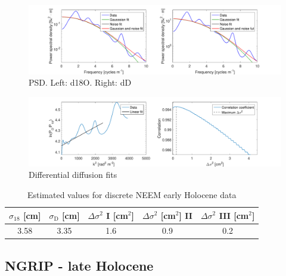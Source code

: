 \documentclass[11pt, draftcls, onecolumn]{IEEEtran} %
\numberwithin{equation}{section}
\numberwithin{table}{section}
\numberwithin{figure}{section}
\begin{document}
\begin{appendices}
\begin{figure}[H]
	\vspace*{2mm}
	\begin{center}
		\includegraphics[width=1\textwidth]{Figure_27}
		\caption{PSD. Left: d18O. Right: dD}  \label{fig:NEEM_dis_fig_1}
	\end{center}
\end{figure}

\begin{figure}[H]
	\vspace*{2mm}
	\begin{center}
		\includegraphics[width=1\textwidth]{Figure_28}
		\caption{Differential diffusion fits}  \label{fig:NEEM_dis_fig_2}
	\end{center}
\end{figure}

\begin{table}[H]
	\center
	\caption{Estimated values for discrete NEEM early Holocene data}
	\label{NEEM_dis_tbl}
	\begin{tabular}{c c c c c} 
		\toprule
		$\sigma_{18}$ [cm] & $\sigma_\mathrm{D}$ [cm] & $\Delta\sigma^2$ I [cm$^2$] & $\Delta\sigma^2$ [cm$^2$] II & $\Delta\sigma^2$ III [cm$^2$] \\
		\midrule
		3.58 &   3.35 &     1.6 &     0.9 &     0.2 \\
		
		\bottomrule		
	\end{tabular}
\end{table}
\clearpage
\subsection{NGRIP - late Holocene}


\end{appendices}
\end{document}
